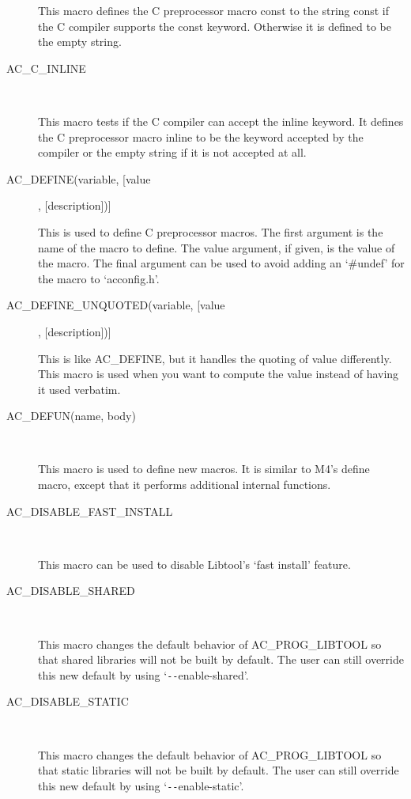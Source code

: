 \begin{description}
    This macro defines the C preprocessor macro const to the string const if the C compiler supports the const keyword. Otherwise it is defined to be the empty string.

\item[AC\_{}C\_{}INLINE]
\

    This macro tests if the C compiler can accept the inline keyword. It defines the C preprocessor macro inline to be the keyword accepted by the compiler or the empty string if it is not accepted at all.

\item[AC\_{}DEFINE(variable, [value], [description])]
\

    This is used to define C preprocessor macros. The first argument is the name of the macro to define. The value argument, if given, is the value of the macro. The final argument can be used to avoid adding an `\#undef' for the macro to `acconfig.h'.

\item[AC\_{}DEFINE\_{}UNQUOTED(variable, [value], [description])]
\

    This is like AC\_{}DEFINE, but it handles the quoting of value differently. This macro is used when you want to compute the value instead of having it used verbatim.

\item[AC\_{}DEFUN(name, body)]
\

    This macro is used to define new macros. It is similar to M4's define macro, except that it performs additional internal functions.

\item[AC\_{}DISABLE\_{}FAST\_{}INSTALL]
\

    This macro can be used to disable Libtool's `fast install' feature.

\item[AC\_{}DISABLE\_{}SHARED]
\

    This macro changes the default behavior of AC\_{}PROG\_{}LIBTOOL so that shared libraries will not be built by default. The user can still override this new default by using `\verb+--+enable-shared'.

\item[AC\_{}DISABLE\_{}STATIC]
\

    This macro changes the default behavior of AC\_{}PROG\_{}LIBTOOL so that static libraries will not be built by default. The user can still override this new default by using `\verb+--+enable-static'.


\end{description}

